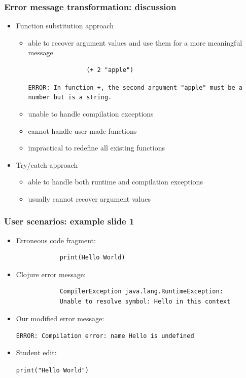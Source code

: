 \documentclass{beamer}
\begin{document}
\begin{frame}[fragile]
\frametitle{Error message transformation: discussion}

	\begin{itemize}
		\item Function substitution approach
			\begin{itemize}
				\item able to recover argument values and use them for a more meaningful message
				\begin{verbatim}
				(+ 2 "apple")
				\end{verbatim}
				\textcolor{PrettyGreen}{
				\texttt{ERROR: In function +, the second argument
				"apple" must be a number but is a string.
				}}
				\item unable to handle compilation exceptions
				\item cannot handle user-made functions
				\item impractical to redefine all existing functions
			\end{itemize}
		\item Try/catch approach
			\begin{itemize}
	 			\item able to handle both runtime and compilation exceptions
				\item usually cannot recover argument values
	 		\end{itemize} 
	\end{itemize}
\end{frame}

\begin{frame}[fragile]
\frametitle{User scenarios: example slide 1}

	\begin{itemize}
		\item Erroneous code fragment:
			\begin{verbatim}
			print(Hello World)
			\end{verbatim}
			
		\item Clojure error message:
			\begin{verbatim}
			CompilerException java.lang.RuntimeException:
			Unable to resolve symbol: Hello in this context
			\end{verbatim}
			
		\item Our modified error message:
		
			\textcolor{PrettyGreen}{
			\texttt{ERROR: Compilation error: name Hello is undefined}
			}
		\item Student edit:
		
				\texttt{print(\alert{"Hello World"})}
	\end{itemize}
	
\end{frame}
\end{document}
